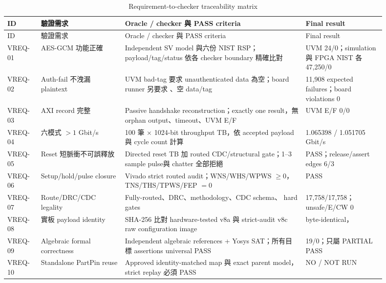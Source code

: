 \documentclass[UTF8,fontset=none,11pt,a4paper]{ctexrep}
\newcommand{\code}[1]{\texttt{\detokenize{#1}}}
\begin{document}
\begingroup
\footnotesize
\setlength{\tabcolsep}{3pt}
\begin{longtable}{@{}p{0.08\linewidth}p{0.20\linewidth}p{0.43\linewidth}p{0.19\linewidth}@{}}
\caption{Requirement-to-checker traceability matrix}\label{tab:vreq}\\
\toprule
ID & 驗證需求 & Oracle / checker 與 PASS criteria & Final result \\
\midrule
\endfirsthead
\toprule
ID & 驗證需求 & Oracle / checker 與 PASS criteria & Final result \\
\midrule
\endhead
VREQ-01 & AES-GCM 功能正確 & Independent SV model 與六份 NIST RSP；payload/tag/status 依各 checker boundary 精確比對 & UVM 24/0；simulation 與 FPGA NIST 各 47,250/0 \\
\addlinespace
VREQ-02 & Auth-fail 不洩漏 plaintext & UVM bad-tag 要求 unauthenticated data 為空；board runner 另要求 \code{0xFF}、空 data/tag & 11,908 expected failures；board violations 0 \\
\addlinespace
VREQ-03 & AXI record 完整 & Passive handshake reconstruction；exactly one result，無 orphan output、timeout、UVM E/F & UVM E/F 0/0 \\
\addlinespace
VREQ-04 & 六模式 $>1$ Gbit/s & 100 筆 $\times$ 1024-bit throughput TB，依 accepted payload 與 cycle count 計算 & 1.065398 / 1.051705 Gbit/s \\
\addlinespace
VREQ-05 & Reset 短脈衝不可誤釋放 & Directed reset TB 加 routed CDC/structural gate；1--3 sample pulse與 chatter 全部拒絕 & PASS；release/assert edges 6/3 \\
\addlinespace
VREQ-06 & Setup/hold/pulse closure & Vivado strict routed audit；WNS/WHS/WPWS $\ge 0$，TNS/THS/TPWS/FEP $=0$ & PASS \\
\addlinespace
VREQ-07 & Route/DRC/CDC legality & Fully-routed、DRC、methodology、CDC schema、\code{check_timing} hard gates & 17,758/17,758；unsafe/E/CW 0 \\
\addlinespace
VREQ-08 & 實板 payload identity & SHA-256 比對 hardware-tested v8a 與 strict-audit v8c raw configuration image & \code{.bin} byte-identical，\code{8A19...B4332F3} \\
\addlinespace
VREQ-09 & Algebraic formal correctness & Independent algebraic references + Yosys SAT；所有目標 assertions universal PASS & 19/0；只屬 PARTIAL PASS \\
\addlinespace
VREQ-10 & Standalone PartPin reuse & Approved identity-matched map 與 exact parent model，strict replay 必須 PASS & NO / NOT RUN \\
\bottomrule
\end{longtable}
\endgroup
\end{document}
